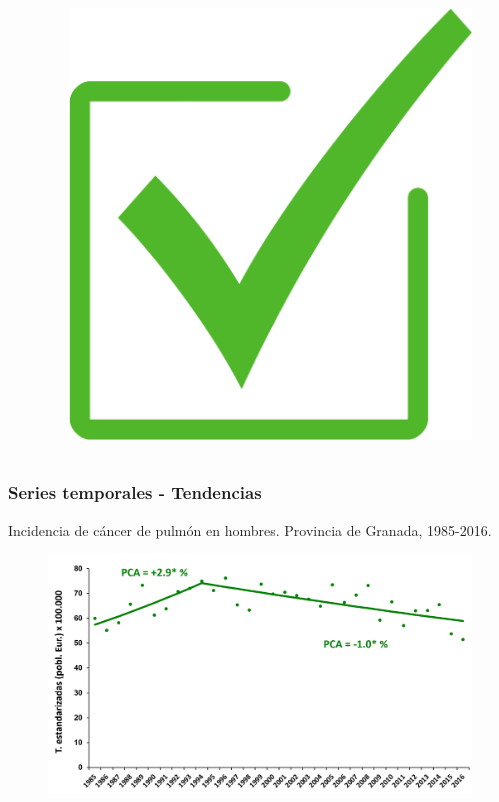 \documentclass{beamer}
\begin{document}
\begin{frame}
	\pause
	\vspace{-110pt}
	\begin{columns}
		\begin{column}{.5\textwidth}
		\end{column}
		\begin{column}{.5\textwidth}
			\begin{figure}
				\centering
				\hspace{20pt}\includegraphics[width=.4\textwidth]{images/check.png}
			\end{figure}
		\end{column}
	\end{columns}
\end{frame}


\begin{frame}\frametitle{Series temporales - Tendencias}
	\centering
	Incidencia de cáncer de pulmón en hombres. Provincia de Granada, 1985-2016.
	\begin{figure}
		\centering
		\includegraphics[width=\textwidth]{images/tendencias_pulmon1.png}
	\end{figure}
\end{frame}
\end{document}
